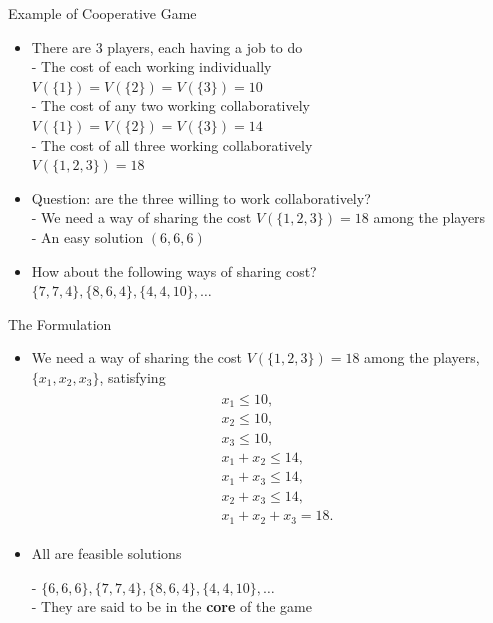 \documentclass[14pt]{beamer}
\begin{document}
\begin{frame}{Example of Cooperative Game}
\begin{itemize}
\small
	\item There are 3 players, each having a job to do\\
\footnotesize
  - The cost of each working individually \\
\qquad \qquad
 $V(\{1\}) = V(\{2\}) = V(\{3\}) = 10$ \\
  - The cost of any two working collaboratively \\
\qquad  \qquad
$V(\{1\}) = V(\{2\}) = V(\{3\}) = 14$ \\
  - The cost of all three working collaboratively  \\
\qquad  \qquad
$V(\{1,2,3\}) = 18$
\small
  \item Question: are the three willing to work collaboratively? \\
\footnotesize
  - We need a way of sharing the cost $V(\{1,2,3\}) = 18$ among the players \\
  - An easy solution $(6, 6, 6)$
\small
  \item How about the following ways of sharing cost? \\
\footnotesize
  $\{7,7,4\}, \{8,6,4\}, \{4,4,10\},\ldots$
\end{itemize}
\end{frame}


\begin{frame}{The Formulation}
\begin{itemize}
\small
	\item We need a way of sharing the cost $V(\{1,2,3\}) = 18$ among the players,$\{x_1, x_2, x_3\}$, satisfying
    \vspace{-0.5em}
    \begin{eqnarray*}
      \begin{aligned}
    &x_1 \leq 10,  \\
    &x_2 \leq 10,  \\
    &x_3 \leq 10,  \\
    &x_1 + x_2 \leq 14, \\
    &x_1 + x_3 \leq 14, \\
    &x_2 + x_3 \leq 14, \\
    &x_1 + x_2 + x_3  = 18.
      \end{aligned}
    \end{eqnarray*}
  \vspace{-1.5em}

  \item All are feasible solutions \\
  \vspace{0.25em}

  - $\{6,6,6\},\{7,7,4\}, \{8,6,4\}, \{4,4,10\},\ldots$ \\
  - They are said to be in the \textbf{core} of the game

\end{itemize}
\end{frame}
\end{document}
